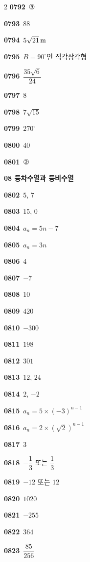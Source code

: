 \documentclass[10pt,a4paper]{article}
\begin{document}
\begin{multicols}{2}
\noindent\textbf{0792}\ ③\par
\noindent\textbf{0793}\ $88$\par
\noindent\textbf{0794}\ $5\sqrt{21}\mkern3mu \mathrm{m}$\par
\noindent\textbf{0795}\ $B=90^\circ$인 직각삼각형\par
\noindent\textbf{0796}\ $\dfrac{35\sqrt{6}}{24}$\par
\noindent\textbf{0797}\ $8$\par
\noindent\textbf{0798}\ $7\sqrt{15}$\par
\noindent\textbf{0799}\ $270^\circ$\par
\noindent\textbf{0800}\ $40$\par
\noindent\textbf{0801}\ ②\par
\noindent\textbf{08 등차수열과 등비수열}\par\smallskip
\noindent\textbf{0802}\ $5$, $7$\par
\noindent\textbf{0803}\ $15$, $0$\par
\noindent\textbf{0804}\ $a_n=5n-7$\par
\noindent\textbf{0805}\ $a_n=3n$\par
\noindent\textbf{0806}\ $4$\par
\noindent\textbf{0807}\ $-7$\par
\noindent\textbf{0808}\ $10$\par
\noindent\textbf{0809}\ $420$\par
\noindent\textbf{0810}\ $-300$\par
\noindent\textbf{0811}\ $198$\par
\noindent\textbf{0812}\ $301$\par
\noindent\textbf{0813}\ $12$, $24$\par
\noindent\textbf{0814}\ $2$, $-2$\par
\noindent\textbf{0815}\ $a_n=5\times(-3)^{n-1}$\par
\noindent\textbf{0816}\ $a_n=2\times(\sqrt{2})^{n-1}$\par
\noindent\textbf{0817}\ $3$\par
\noindent\textbf{0818}\ $-\dfrac{1}{3}$ 또는 $\dfrac{1}{3}$\par
\noindent\textbf{0819}\ $-12$ 또는 $12$\par
\noindent\textbf{0820}\ $1020$\par
\noindent\textbf{0821}\ $-255$\par
\noindent\textbf{0822}\ $364$\par
\noindent\textbf{0823}\ $\dfrac{85}{256}$\par

\end{multicols}
\end{document}
